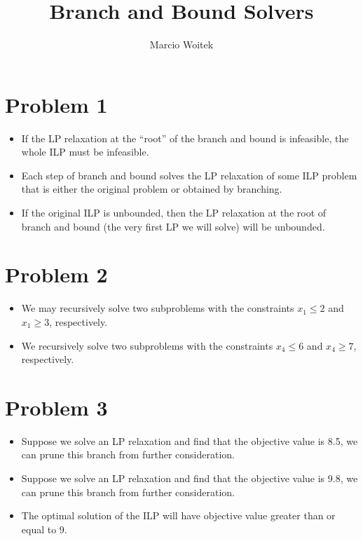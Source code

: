 \documentclass[11pt]{article}
\author{Marcio Woitek}
\date{}
\title{Branch and Bound Solvers}
\begin{document}
\maketitle
\thispagestyle{empty}
\pagestyle{empty}

\section*{Problem 1}
\label{sec:orgfeda050}
\begin{itemize}
\item If the LP relaxation at the ``root'' of the branch and bound is infeasible, the
whole ILP must be infeasible.
\item Each step of branch and bound solves the LP relaxation of some ILP problem
that is either the original problem or obtained by branching.
\item If the original ILP is unbounded, then the LP relaxation at the root of branch
and bound (the very first LP we will solve) will be unbounded.
\end{itemize}

\section*{Problem 2}
\label{sec:orgbb5143c}
\begin{itemize}
\item We may recursively solve two subproblems with the constraints \(x_1 \leq 2\) and
\(x_1 \geq 3\), respectively.
\item We recursively solve two subproblems with the constraints \(x_4 \leq 6\) and
\(x_4 \geq 7\), respectively.
\end{itemize}

\section*{Problem 3}
\label{sec:orge2d974d}
\begin{itemize}
\item Suppose we solve an LP relaxation and find that the objective value is 8.5, we
can prune this branch from further consideration.
\item Suppose we solve an LP relaxation and find that the objective value is 9.8, we
can prune this branch from further consideration.
\item The optimal solution of the ILP will have objective value greater than or
equal to 9.
\end{itemize}
\end{document}
